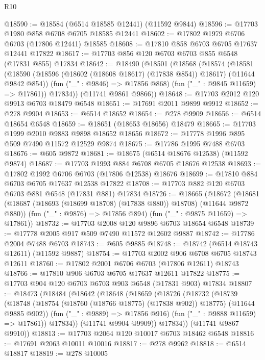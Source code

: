 \begin{lexlean}{R10}
\begin{coremodule}
@18590 := @18584 (@6514 @18585 @12441) (@11592 @9844)
@18596 := @17703 @1980 @858 @6708 @6705 @18585 @12441
@18602 := @17802 @1979 @6706 @6703 (@17806 @12441) @18585
@18608 := @17810 @858 @6703 @6705 @17637 @12441 @17822
@18617 := @17703 @856 @120 @6703 @6703 @855 @6548 (@17831 @855) @17834
@18642 := @18490
    (@18501
      (@18568
        (@18574
          (@18581
            (@18590 (@18596 (@18602 (@18608 @18617) (@17838 @854)) @18617) (@11644 @9842 @854))
            (fun ("_" : @9846) => @17856 @868)
            (fun ("_" : @9845 @11659) => @17861))
          @17834))
      (@11741 @9861 @9866))
@18648 := @17703 @2012 @120 @9913 @6703 @18479 @6548
@18651 := @17691 @2011 @9899 @9912
@18652 := @278 @9904
@18653 := @6514 @18652
@18654 := @278 @9909
@18656 := @6514 @18654 @6548
@18659 := @18651 (@18653 @18656) @18479
@18665 := @17703 @1999 @2010 @9883 @9898 @18652 @18656
@18672 := @17778 @1996 @895 @509 @7490 @11572 @12529 @9874
@18675 := @17786 @1995 @7488 @6703
@18676 := @605 @9872
@18681 := @18675 (@6514 @18676 @12538) (@11592 @9874)
@18687 := @17703 @1993 @884 @6708 @6705 @18676 @12538
@18693 := @17802 @1992 @6706 @6703 (@17806 @12538) @18676
@18699 := @17810 @884 @6703 @6705 @17637 @12538 @17822
@18708 := @17703 @882 @120 @6703 @6703 @881 @6548 (@17831 @881) @17834
@18726 := @18665
    (@18672
      (@18681 (@18687 (@18693 (@18699 @18708) (@17838 @880)) @18708) (@11644 @9872 @880))
      (fun ("_" : @9876) => @17856 @894)
      (fun ("_" : @9875 @11659) => @17861))
@18732 := @17703 @2008 @120 @9896 @6703 @18654 @6548
@18739 := @17778 @2005 @917 @509 @7490 @11572 @12602 @9887
@18742 := @17786 @2004 @7488 @6703
@18743 := @605 @9885
@18748 := @18742 (@6514 @18743 @12611) (@11592 @9887)
@18754 := @17703 @2002 @906 @6708 @6705 @18743 @12611
@18760 := @17802 @2001 @6706 @6703 (@17806 @12611) @18743
@18766 := @17810 @906 @6703 @6705 @17637 @12611 @17822
@18775 := @17703 @904 @120 @6703 @6703 @903 @6548 (@17831 @903) @17834
@18807 := @18473
    (@18484
      (@18642
        (@18648
          (@18659
            (@18726
              (@18732
                (@18739
                  (@18748
                    (@18754 (@18760 (@18766 @18775) (@17838 @902)) @18775)
                    (@11644 @9885 @902))
                  (fun ("_" : @9889) => @17856 @916)
                  (fun ("_" : @9888 @11659) => @17861))
                @17834))
            (@11741 @9904 @9909))
          @17834))
      (@11741 @9867 @9910))
@18813 := @17703 @2064 @120 @10017 @6703 @18462 @6548
@18816 := @17691 @2063 @10011 @10016
@18817 := @278 @9962
@18818 := @6514 @18817
@18819 := @278 @10005

\end{coremodule}
\end{lexlean}

